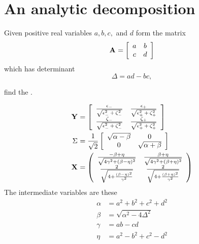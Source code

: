 \section{An analytic decomposition}

Given positive real variables $a, b, c,$ and $d$ form the matrix
\begin{equation}
  \A{} = \mat{cc}{a&b\\c&d}
\end{equation}
which has determinant
\begin{equation}
  \Delta = ad - bc,
\end{equation}

find the \svdl.

\begin{equation}
  \begin{split}
    \Y{}  &= \mat{cc}
    {
    \frac{\epsilon_{-}}{\sqrt{\epsilon_{-}^{2}\,+\,\zeta_{-}^{2}}} & \frac{\epsilon_{+}}{\sqrt{\epsilon_{+}^{2}\,+\,\zeta_{+}^{2}}} \\
    \frac{\zeta_{-}}{\sqrt{\epsilon_{-}^{2}\,+\,\zeta_{-}^{2}}} & \frac{\zeta_{+}}{\sqrt{\epsilon_{+}^{2}\,+\,\zeta_{+}^{2}}} \\
    }\\
    \sig{}&=\frac{1}{\sqrt{2}}\mat{cc}{\sqrt{\alpha-\beta}&0\\0&\sqrt{\alpha+\beta}}\\
    \X{}  &=
    \left(
\begin{array}{cc}
 \frac{-\beta +\eta }{\sqrt{4\gamma ^2+(\beta -\eta )^2}} & \frac{\beta +\eta }{\sqrt{4\gamma ^2+(\beta +\eta )^2}} \\
 \frac{2}{\sqrt{4+\frac{(\beta -\eta )^2}{\gamma ^2}}} & \frac{2}{\sqrt{4+\frac{(\beta +\eta )^2}{\gamma ^2}}}
\end{array}
\right)
  \end{split}
\end{equation}
The intermediate variables are these
\begin{equation}
  \begin{split}
    \alpha&=a^{2}+b^{2}+c^{2}+d^{2}\\
    \beta&=\sqrt{\alpha^{2}-4\Delta^{2}}\\
    \gamma&=ab-cd\\
    \eta&=a^{2}-b^{2}+c^{2}-d^{2}
  \end{split}
\end{equation}


\endinput